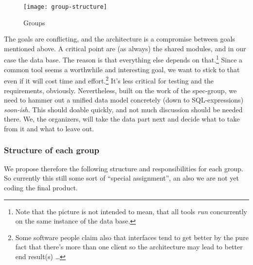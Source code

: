 \documentclass[11pt,handout,nologo]{handout}
\begin{document}
{

\begin{figure}[htbp]
  \centering
  \texttt{[image: group-structure]}  
  \caption{Groups}
  \label{fig:groups}
\end{figure}


The goals are conflicting, and the architecture is a compromise between
goals mentioned above. A critical point are (as always) the shared modules,
and in our case the data base. The reason is that everything else depends
on that.\footnote{Note that the picture is not intended to mean, that all
  tools \emph{run} concurrently on the same instance of the data base.}
Since a common tool seems a worthwhile and interesting goal, we want to
stick to that even if it will cost time and effort.\footnote{Some software
  people claim also that interfaces tend to get better by the pure fact
  that there's more than one client so the architecture may lead to better
  end result(s) \ldots} It's less critical for testing and the
requirements, obviously.  Nevertheless, built on the work of the
spec-group, we need to hammer out a unified data model concretely (down to
SQL-expressions) \emph{soon-ish.}  This should doable quickly, and not much
discussion should be needed there. We, the organizers, will take the data
part next and decide what to take from it and what to leave out. 



\subsubsection*{Structure of each group}

We propose therefore the following structure and responsibilities for each
group. So currently this still some sort of ``special assignment'', an also
we are not yet coding the final product.



}
\end{document}
